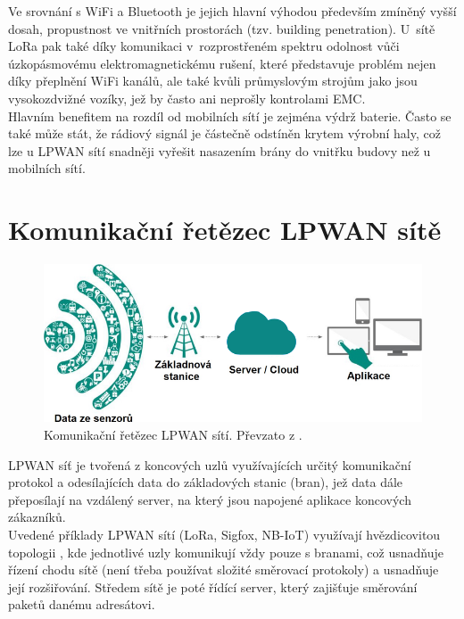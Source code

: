     
    Ve srovnání s WiFi a Bluetooth je jejich hlavní výhodou především zmíněný vyšší dosah, propustnost ve vnitřních prostorách (tzv. building penetration). U~sítě LoRa pak také díky komunikaci v~rozprostřeném spektru odolnost vůči úzkopásmovému elektromagnetickému rušení, které představuje problém nejen díky přeplnění WiFi kanálů, ale také kvůli průmyslovým strojům jako jsou vysokozdvižné vozíky, jež by často ani neprošly kontrolami EMC.\\
    Hlavním benefitem na rozdíl od mobilních sítí je zejména výdrž baterie. Často se také může stát, že rádiový signál je částečně odstíněn krytem výrobní haly, což lze u LPWAN sítí snadněji vyřešit nasazením brány do vnitřku budovy než u mobilních sítí.

    
\section{Komunikační řetězec LPWAN sítě}
    \begin{figure} [!ht]
        \centering
        \caption{Komunikační řetězec LPWAN sítí. Převzato z \cite{website:4}.}
        \includegraphics[width=\textwidth]{LPWAN/Figs/communication_chain.png}
    \end{figure} 
    LPWAN síť je tvořená z koncových uzlů využívajících určitý komunikační protokol a odesílajících data do základových stanic (bran), jež data dále přeposílají na vzdálený server, na který jsou napojené aplikace koncových zákazníků.\\
    Uvedené příklady LPWAN sítí (LoRa, Sigfox, NB-IoT) využívají hvězdicovitou topologii \cite{website:4}, kde jednotlivé uzly komunikují vždy pouze s branami, což usnadňuje řízení chodu sítě (není třeba používat složité směrovací protokoly) a usnadňuje její rozšiřování. Středem sítě je poté řídící server, který zajišťuje směrování paketů danému adresátovi.
    
